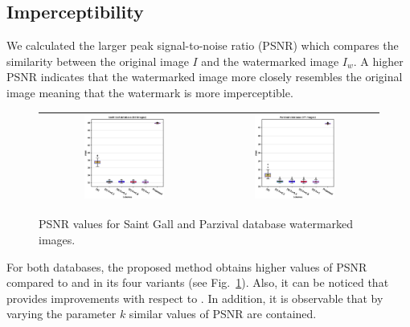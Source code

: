 \documentclass[runningheads]{llncs}
\begin{document}
\subsection{Imperceptibility}
We calculated the larger peak signal-to-noise ratio (PSNR) which compares the similarity between the original image $ I $ and the watermarked image $ I_w $. A higher PSNR indicates that the watermarked image more closely resembles the original image meaning that the watermark is more imperceptible.
\begin{figure}[H]
	\begin{center}
		\begin{tabular}{|c|c|}\hline
			\includegraphics[width=0.5\textwidth]{PSNR_saintgall.eps}
			&\includegraphics[width=0.5\textwidth]{PSNR_parzival.eps}\\\hline
		\end{tabular}
	\end{center}
	\caption{PSNR values for Saint Gall and Parzival database watermarked images.}
	\label{psnr}
\end{figure}
For both databases, the proposed method obtains higher values of PSNR compared to \cite{shivani2017dual} and \cite{liu2018blind} in its four variants (see Fig.~\ref{psnr}). Also, it can be noticed that \cite{shivani2017dual} provides improvements with respect to \cite{liu2018blind}. In addition, it is observable that by varying the parameter $k$ similar values of PSNR are contained.  
\end{document}
